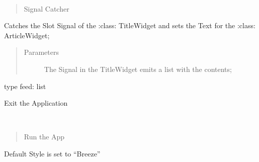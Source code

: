 \documentclass[letterpaper,10pt,english]{sphinxmanual}
\begin{document}
\begin{fulllineitems}
\begin{fulllineitems}
\begin{quote}
\begin{description}
\end{description}\end{quote}

\end{fulllineitems}


\begin{fulllineitems}
\label{\detokenize{anfrss.gui:anfrss.gui.guiapp.ANFApp.title_click}}~\begin{quote}

Signal Catcher
\end{quote}

Catches the Slot Signal
of the
:class: TitleWidget
and sets the Text for the
:class: ArticleWidget;
\begin{quote}\begin{description}
\item[{Parameters}] \leavevmode
{} \textendash{} The Signal
in the TitleWidget
emits a list with
the contents;

\end{description}\end{quote}

type feed: list

\end{fulllineitems}


\begin{fulllineitems}
\label{\detokenize{anfrss.gui:anfrss.gui.guiapp.ANFApp.exit}}
Exit the Application

\end{fulllineitems}


\end{fulllineitems}


\begin{fulllineitems}
\label{\detokenize{anfrss.gui:anfrss.gui.guiapp.run}}~\begin{quote}

Run the App
\end{quote}

Default Style is set
to “Breeze”

\end{fulllineitems}
\end{document}
